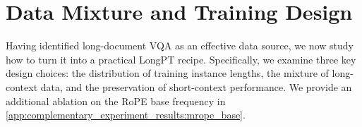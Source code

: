 \section{Data Mixture and Training Design}
\label{sec:mixing}
Having identified long-document VQA as an effective data source, we now study how to turn it into a practical LongPT recipe.
Specifically, we examine three key design choices: the distribution of training instance lengths, the mixture of long-context data, and the preservation of short-context performance.
We provide an additional ablation on the RoPE base frequency in \cref{app:complementary_experiment_results:mrope_base}.


\begin{table}[t]
 \centering
 \caption{Long-context data mixture test. We grid search the mix of information extraction vs.\ reasoning tasks from $0:10$ to $10:0$ under the fixed 5B-token budget. \textbf{Ratio} represents the extraction-to-reasoning ratio.}
 \label{tab:extract_reason_ratio}
 \setlength{\tabcolsep}{4pt}
\end{table}

